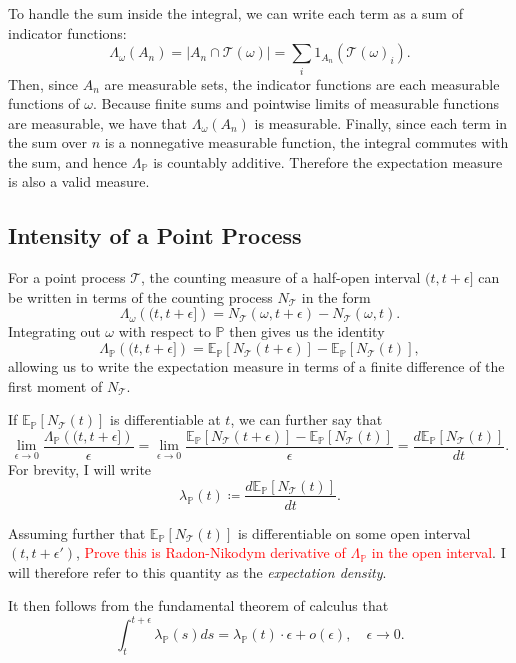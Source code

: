 \documentclass[honours,12pt]{unswthesis}
\numberwithin{equation}{section}
\begin{document}
To handle the sum inside the integral, we can write each term as a sum of indicator functions:
$$\Lambda_\omega(A_n) = \left\vert A_n\cap \mathcal{T}(\omega)\right\vert = \sum_i 1_{A_n}\left(\mathcal{T}(\omega)_i\right).$$
Then, since $A_n$ are measurable sets, the indicator functions are each measurable functions of $\omega$. Because finite sums and pointwise limits of measurable functions are measurable, we have that $\Lambda_\omega(A_n)$ is measurable.  Finally, since each term in the sum over $n$ is a nonnegative measurable function, the integral commutes with the sum, and hence $\Lambda_\mathbb{P}$ is countably additive. Therefore the expectation measure is also a valid measure.

\subsection{Intensity of a Point Process}
For a point process $\mathcal{T}$, the counting measure of a half-open interval $(t,t+\epsilon]$ can be written in terms of the counting process $N_\mathcal{T}$ in the form
$$\Lambda_\omega\left((t,t+\epsilon]\right) = N_\mathcal{T}(\omega,t+\epsilon) - N_\mathcal{T}(\omega,t).$$
Integrating out $\omega$ with respect to $\mathbb{P}$ then gives us the identity
$$\Lambda_\mathbb{P}\left((t,t+\epsilon]\right) = \mathbb{E}_\mathbb{P}\left[N_\mathcal{T}(t+\epsilon)\right] - \mathbb{E}_\mathbb{P}\left[N_\mathcal{T}(t)\right],$$
allowing us to write the expectation measure in terms of a finite difference of the first moment of $N_\mathcal{T}$.

If $\mathbb{E}_\mathbb{P}\left[N_\mathcal{T}(t)\right]$ is differentiable at $t$, we can further say that
$$\lim_{\epsilon\to0}\frac{\Lambda_\mathbb{P}\left((t,t+\epsilon]\right)}{\epsilon} = \lim_{\epsilon\to0}\frac{\mathbb{E}_\mathbb{P}\left[N_\mathcal{T}(t+\epsilon)\right] - \mathbb{E}_\mathbb{P}\left[N_\mathcal{T}(t)\right]}{\epsilon} = \frac{d\mathbb{E}_\mathbb{P}\left[N_\mathcal{T}(t)\right]}{dt}.$$
For brevity, I will write
$$\lambda_{\mathbb{P}}(t) \coloneq \frac{d\mathbb{E}_\mathbb{P}\left[N_\mathcal{T}(t)\right]}{dt}.$$

Assuming further that $\mathbb{E}_\mathbb{P}\left[N_\mathcal{T}(t)\right]$ is differentiable on some open interval $(t,t+\epsilon')$, \textcolor{red}{Prove this is Radon-Nikodym derivative of $\Lambda_\mathbb{P}$ in the open interval}. I will therefore refer to this quantity as the \textit{expectation density}.

It then follows from the fundamental theorem of calculus that
$$\int_t^{t+\epsilon} \lambda_{\mathbb{P}}(s)ds = \lambda_{\mathbb{P}}(t)\cdot\epsilon + o(\epsilon),\quad \epsilon\to 0.$$
\end{document}
